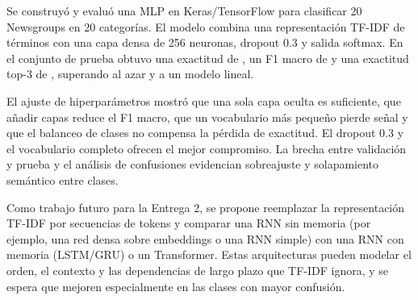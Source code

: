 \documentclass[11pt,letterpaper]{article}
\begin{document}
Se construyó y evaluó una MLP en Keras/TensorFlow para clasificar 20 Newsgroups en 20 categorías. El modelo combina una representación TF-IDF de \Vocab{} términos con una capa densa de 256 neuronas, dropout 0.3 y salida softmax. En el conjunto de prueba obtuvo una exactitud de \Accuracy{}, un F1 macro de \MacroF{} y una exactitud top-3 de \TopThree{}, superando al azar y a un modelo lineal.

El ajuste de hiperparámetros mostró que una sola capa oculta es suficiente, que añadir capas reduce el F1 macro, que un vocabulario más pequeño pierde señal y que el balanceo de clases no compensa la pérdida de exactitud. El dropout 0.3 y el vocabulario completo ofrecen el mejor compromiso. La brecha entre validación y prueba y el análisis de confusiones evidencian sobreajuste y solapamiento semántico entre clases.

Como trabajo futuro para la Entrega 2, se propone reemplazar la representación TF-IDF por secuencias de tokens y comparar una RNN sin memoria (por ejemplo, una red densa sobre embeddings o una RNN simple) con una RNN con memoria (LSTM/GRU) o un Transformer. Estas arquitecturas pueden modelar el orden, el contexto y las dependencias de largo plazo que TF-IDF ignora, y se espera que mejoren especialmente en las clases con mayor confusión.
\end{document}
